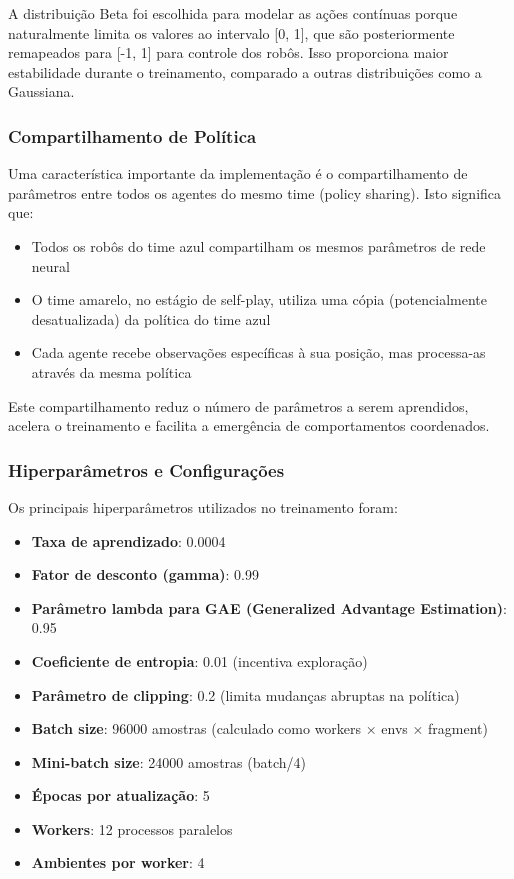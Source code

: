 A distribuição Beta foi escolhida para modelar as ações contínuas porque naturalmente limita os valores ao intervalo [0, 1], que são posteriormente remapeados para [-1, 1] para controle dos robôs. Isso proporciona maior estabilidade durante o treinamento, comparado a outras distribuições como a Gaussiana.

\subsubsection{Compartilhamento de Política}

Uma característica importante da implementação é o compartilhamento de parâmetros entre todos os agentes do mesmo time (policy sharing). Isto significa que:

\begin{itemize}
    \item Todos os robôs do time azul compartilham os mesmos parâmetros de rede neural
    \item O time amarelo, no estágio de self-play, utiliza uma cópia (potencialmente desatualizada) da política do time azul
    \item Cada agente recebe observações específicas à sua posição, mas processa-as através da mesma política
\end{itemize}

Este compartilhamento reduz o número de parâmetros a serem aprendidos, acelera o treinamento e facilita a emergência de comportamentos coordenados.

\subsubsection{Hiperparâmetros e Configurações}

Os principais hiperparâmetros utilizados no treinamento foram:

\begin{itemize}
    \item \textbf{Taxa de aprendizado}: 0.0004
    \item \textbf{Fator de desconto (gamma)}: 0.99
    \item \textbf{Parâmetro lambda para GAE (Generalized Advantage Estimation)}: 0.95
    \item \textbf{Coeficiente de entropia}: 0.01 (incentiva exploração)
    \item \textbf{Parâmetro de clipping}: 0.2 (limita mudanças abruptas na política)
    \item \textbf{Batch size}: 96000 amostras (calculado como workers × envs × fragment)
    \item \textbf{Mini-batch size}: 24000 amostras (batch/4)
    \item \textbf{Épocas por atualização}: 5
    \item \textbf{Workers}: 12 processos paralelos
    \item \textbf{Ambientes por worker}: 4
\end{itemize}


